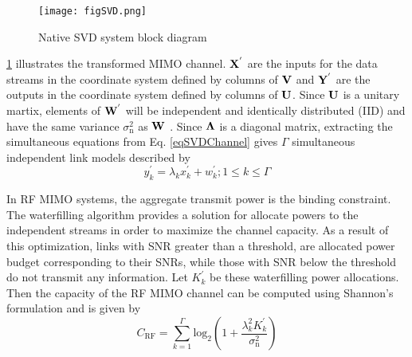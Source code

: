\begin{figure}[!t]
	\centering
		\texttt{[image: figSVD.png]}
	\caption[Native SVD dystem block diagram]{Native SVD system block diagram}
	\label{fig:SVD}
\end{figure}

\figurename{ {\ref{fig:SVD}}} illustrates the transformed MIMO channel. $\bf{X}^{'}$ are the inputs for the data streams in the coordinate system defined by columns of $\bf{V}$ and $\bf{Y}^{'}$ are the outputs in the coordinate system defined by columns of $\bf{U}$. Since $\bf{U}$ is a unitary martix, elements of $\bf{W}^{'}$ will be independent and identically distributed (IID) and have the same variance $\sigma_{\text{n}}^{2}$ as $\bf{W}$ \cite{tse05a}. Since $\bf{\Lambda}$ is a diagonal matrix, extracting the simultaneous equations from Eq. \eqref{eqSVDChannel} gives $\Gamma$ simultaneous independent link models described by
\begin{equation}
	\label{eqSVDChannel2}
	y^{'}_{k} = \lambda_{k}x^{'}_{k} + w^{'}_{k}; 1\leq{k}\leq\Gamma
\end{equation}

In RF MIMO systems, the aggregate transmit power is the binding constraint. The waterfilling algorithm \cite{gol97a} provides a solution for allocate powers to the independent streams in order to maximize the channel capacity. As a result of this optimization, links with SNR greater than a threshold, are allocated power budget corresponding to their SNRs, while those with SNR below the threshold do not transmit any information. Let ${K^{'}_{k}}$ be these waterfilling power allocations. Then the capacity of the RF MIMO channel can be computed using Shannon's formulation \cite{sha48a} and is given by
\begin{equation}
	\label{eqSVDCap}
	C_{\text{RF}} = \sum_{k=1}^{\Gamma}\text{log}^{ }_{2}\left(1 + \frac{\lambda_{k}^{2} {K}^{'}_{k}}{\sigma_{\text{n}}^{2}}\right)
\end{equation}

